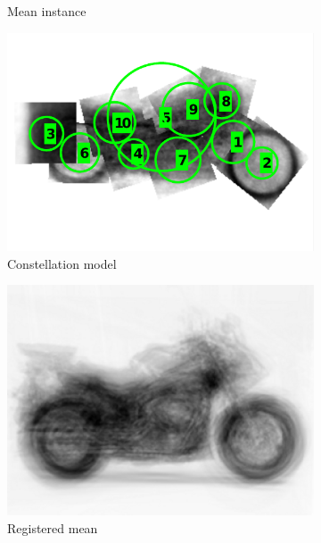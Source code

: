 \begin{figure}[ht]
\begin{subfigure}[b]{0.19\linewidth}
	\caption{Mean instance}
	\label{fig:concept2}
\end{subfigure}
\begin{subfigure}[b]{0.19\linewidth}
	\includegraphics[width=\linewidth]{fig/3dreg/pictorial2.pdf}
	\caption{Constellation model}
	\label{fig:concept4}
\end{subfigure}
\begin{subfigure}[b]{0.19\linewidth}
	\label{fig:concept3}
	\includegraphics[width=\linewidth]{fig/3dreg/avgbike_after.png}
	\caption{Registered mean}
\end{subfigure}
\begin{subfigure}[b]{0.19\linewidth}
	\label{fig:concept5}

\end{subfigure}
\end{figure}
